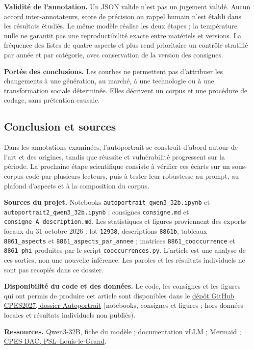 \documentclass[a4paper,11pt]{article}
\begin{document}
\textbf{Validité de l'annotation.}
Un JSON valide n'est pas un jugement validé. Aucun accord inter-annotateurs,
score de précision ou rappel humain n'est établi dans les résultats étudiés.
Le même modèle réalise les deux étapes ; la température nulle ne garantit
pas une reproductibilité exacte entre matériels et versions. La fréquence
des listes de quatre aspects et plus rend prioritaire un contrôle stratifié par année et
par catégorie, avec conservation de la version des consignes.

\textbf{Portée des conclusions.}
Les courbes ne permettent pas d'attribuer les changements à une génération,
au marché, à une technologie ou à une transformation sociale déterminée.
Elles décrivent un corpus et une procédure de codage, sans prétention causale.

\subsection{Conclusion et sources}
Dans les annotations examinées, l'autoportrait se construit d'abord autour de
l'art et des origines, tandis que réussite et vulnérabilité progressent sur
la période. La prochaine étape scientifique consiste à vérifier ces écarts
sur un sous-corpus codé par plusieurs lecteurs, puis à tester leur robustesse
au prompt, au plafond d'aspects et à la composition du corpus.

\enlargethispage{2\baselineskip}
{\footnotesize\raggedright
\textbf{Sources du projet.} Notebooks
\texttt{autoportrait\_qwen3\_32b.ipynb} et
\texttt{autoportrait2\_qwen3\_32b.ipynb} ; consignes
\texttt{consigne.md} et \texttt{consigne\_A\_description.md}.
Les statistiques et figures proviennent des exports locaux du 31 octobre
2026 : lot \texttt{12938}, descriptions \texttt{8861b}, tableaux
\texttt{8861\_aspects} et \texttt{8861\_aspects\_par\_annee} ; matrices
\texttt{8861\_cooccurrence} et \texttt{8861\_phi} produites par le script
\texttt{cooccurrences.py}.
L'article est une analyse de ces sorties, non une nouvelle inférence.
Les paroles et les résultats individuels ne sont pas recopiés dans ce dossier.

\textbf{Disponibilité du code et des données.}
Le code, les consignes et les figures qui ont permis de produire cet article
sont disponibles dans le
\href{https://github.com/BenaventC/CPES2027/tree/main/Autoportrait}{dépôt GitHub CPES2027, dossier Autoportrait}
(notebooks, consignes et figures ; hors données locales et résultats individuels non publiés).

\textbf{Ressources.}
\href{https://huggingface.co/Qwen/Qwen3-32B}{Qwen3-32B, fiche du modèle} ;
\href{https://docs.vllm.ai/}{documentation vLLM} ;
\href{https://mermaid.js.org/}{Mermaid} ;
\href{https://psl.eu/formation/cpes-psl-louis-le-grand}{CPES DAC, PSL--Louis-le-Grand}.
}
\end{document}
